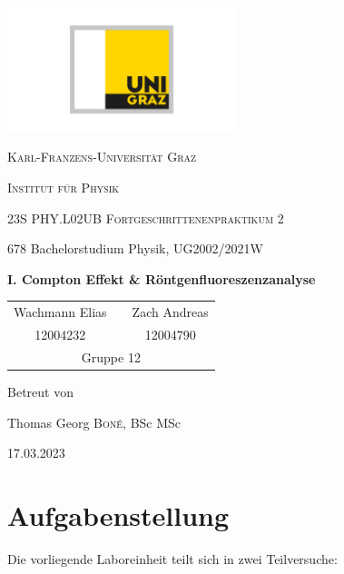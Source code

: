 \documentclass[ngerman]{scrartcl}
\begin{document}
\begin{titlepage}
    \centering
    \includegraphics[width=0.5\textwidth]{../../99_Misc/Logo_KF.pdf}\par\vspace{0.8cm}
    {\scshape\LARGE{Karl-Franzens-Universität Graz}\par}
    {\scshape\LARGE{Institut für Physik}\par}
    \vspace{1cm}
    {\scshape\Large{23S PHY.L02UB Fortgeschrittenenpraktikum 2}\par}
    678 Bachelorstudium Physik, UG2002/2021W\par
    \vspace{1.5cm}
    {\huge\bfseries I. Compton Effekt \& Röntgenfluoreszenzanalyse\par}
    \vspace{2cm}
    \begin{table}[H]
        \centering
        \begin{tabular}{c c c}
            \Large Wachmann Elias &  & \Large Zach Andreas \\
            \Large 12004232       &  & \Large 12004790     \\
            \multicolumn{3}{c}{Gruppe 12}
        \end{tabular}
    \end{table}
    \vfill
    \Large Betreut von\par
    Thomas Georg \textsc{Boné}, BSc MSc
    \vfill
    {\large 17.03.2023\par}
\end{titlepage}

\clearpage
\tableofcontents
\newpage

\section[Aufgabenstellung]{Aufgabenstellung \cite{ref:angabe_compton,ref:angabe_roentgen}}
\label{sec:aufgabenstellung}

Die vorliegende Laboreinheit teilt sich in zwei Teilversuche:
\end{document}
